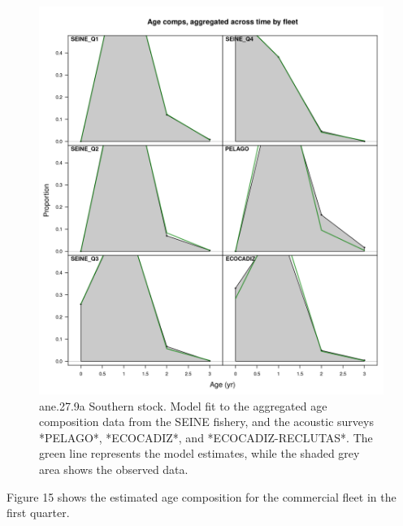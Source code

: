 \documentclass[
]{article}
\begin{document}
\begin{figure}[H]

{\centering \includegraphics[width=0.95\linewidth]{report/run/S1.0_4FLEETS_SelECO_RecIndex_Mnewfix/fig_age_fit_agg} 

}

\caption{ane.27.9a Southern stock. Model fit to the aggregated age composition data from the SEINE fishery, and the acoustic surveys *PELAGO*, *ECOCADIZ*, and *ECOCADIZ-RECLUTAS*. The green line represents the model estimates, while the shaded grey area shows the observed data.}\label{fig:unnamed-chunk-44}
\end{figure}

Figure 15 shows the estimated age composition for the commercial fleet
in the first quarter.
\end{document}
